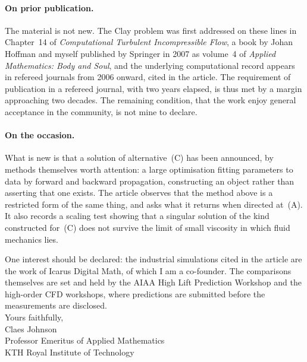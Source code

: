\documentclass[11pt]{article}
\begin{document}
\paragraph{On prior publication.} The material is not new. The Clay problem was first addressed on
these lines in Chapter~14 of \emph{Computational Turbulent Incompressible Flow}, a book by Johan
Hoffman and myself published by Springer in 2007 as volume~4 of \emph{Applied Mathematics: Body and
Soul}, and the underlying computational record appears in refereed journals from 2006 onward, cited
in the article. The requirement of publication in a refereed journal, with two years elapsed, is thus
met by a margin approaching two decades. The remaining condition, that the work enjoy general
acceptance in the community, is not mine to declare.

\paragraph{On the occasion.} What is new is that a solution of alternative~(C) has been announced, by
methods themselves worth attention: a large optimisation fitting parameters to data by forward and
backward propagation, constructing an object rather than asserting that one exists. The article
observes that the method above is a restricted form of the same thing, and asks what it returns when
directed at~(A). It also records a scaling test showing that a singular solution of the kind
constructed for~(C) does not survive the limit of small viscosity in which fluid mechanics lies.

One interest should be declared: the industrial simulations cited in the article are the work of
Icarus Digital Math, of which I am a co-founder. The comparisons themselves are set and held by the
AIAA High Lift Prediction Workshop and the high-order CFD workshops, where predictions are submitted
before the measurements are disclosed.\\[1.4em]

\noindent Yours faithfully,\\[2.2em]

\noindent Claes Johnson\\
\noindent Professor Emeritus of Applied Mathematics\\
\noindent KTH Royal Institute of Technology
\end{document}
